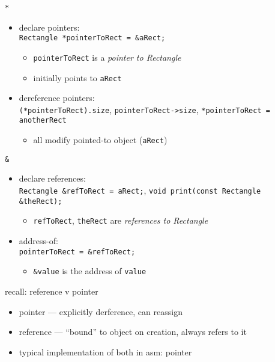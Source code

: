 \begin{frame}[fragile,label=star]{\texttt{*}}
\lstset{
    language=C++,
    style=small,
    morekeywords=Rectangle
}
\begin{itemize}
\item declare pointers: \\
 \lstinline|Rectangle *pointerToRect = &aRect;|
    \begin{itemize}
    \item \texttt{pointerToRect} is a \textit{pointer to Rectangle}
    \item initially points to \lstinline|aRect|
    \end{itemize}
\item dereference pointers: \\ \lstinline|(*pointerToRect).size|, \lstinline|pointerToRect->size|, \lstinline|*pointerToRect = anotherRect|
    \begin{itemize}
    \item all modify pointed-to object (\lstinline|aRect|)
    \end{itemize}
\end{itemize}
\end{frame}

\begin{frame}[fragile,label=amp]{\texttt{\&}}
\begin{itemize}
\item declare references: \\ \lstinline|Rectangle &refToRect = aRect;|, \lstinline|void print(const Rectangle &theRect);|
    \begin{itemize}
    \item \texttt{refToRect}, \texttt{theRect} are \textit{references to Rectangle}
    \end{itemize}
\item address-of: \\ \lstinline|pointerToRect = &refToRect;|
    \begin{itemize}
    \item \lstinline|&value| is the address of \lstinline|value|
    \end{itemize}
\end{itemize}
\end{frame}

\begin{frame}{recall: reference v pointer}
\begin{itemize}
\item pointer --- explicitly derference, can reassign
\item reference --- ``bound'' to object on creation, always refers to it
\vspace{.5cm}
\item typical implementation of both in asm: pointer
\end{itemize}
\end{frame}
